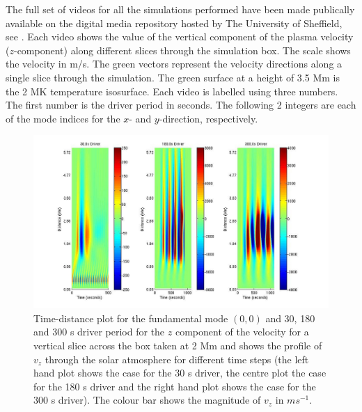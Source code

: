 \documentclass[preprint,authoryear,12pt]{elsarticle}
\begin{document}
The full set of videos for all the simulations performed have been made publically available on the digital media repository hosted by The University of Sheffield, see \citet{Griffiths2017}. Each video shows the value of the vertical component of the plasma velocity ($z$-component) along different slices through the simulation box. The scale shows the velocity in m/s. The green vectors represent the velocity directions along a single slice through the simulation. The green surface at a height of 3.5 Mm is the 2 MK temperature isosurface. 
Each video is labelled using three numbers. The first number is the driver period in seconds. The following 2 integers are each of the mode indices for the $x$- and $y$-direction, respectively.
\begin{figure}[h]
\includegraphics[scale=1.8]{imrescale/fig2_dt_30_180_300_0_vert_2Mm.jpg}
\caption{Time-distance plot for the fundamental mode $(0,0)$ and 30, 180 and 300 s driver period for the $z$ component of the velocity for a vertical slice across the box  taken at 2 Mm and shows  the profile of $v_{z}$ through the solar atmosphere for different time steps (the left hand plot shows the case for the 30 s driver, the centre plot the case for the 180 s driver and the right hand plot shows the case for the 300 s  driver). The colour bar shows the magnitude of $v_z$ in $ms^{-1}$.}
\label{Fig3}
\end{figure}
\end{document}
